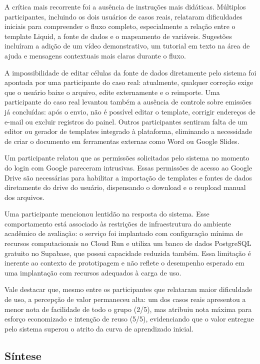 \documentclass[article,a4paper,12pt,brazil,sumario=tradicional]{abntex2}
\begin{document}
A crítica mais recorrente foi a ausência de instruções mais didáticas. Múltiplos participantes, incluindo os dois usuários de casos reais, relataram dificuldades iniciais para compreender o fluxo completo, especialmente a relação entre o template Liquid, a fonte de dados e o mapeamento de variáveis. Sugestões incluíram a adição de um vídeo demonstrativo, um tutorial em texto na área de ajuda e mensagens contextuais mais claras durante o fluxo.

A impossibilidade de editar células da fonte de dados diretamente pelo sistema foi apontada por uma participante do caso real: atualmente, qualquer correção exige que o usuário baixe o arquivo, edite externamente e o reimporte. Uma participante do caso real levantou também a ausência de controle sobre emissões já concluídas: após o envio, não é possível editar o template, corrigir endereços de e-mail ou excluir registros do painel. Outros participantes sentiram falta de um editor ou gerador de templates integrado à plataforma, eliminando a necessidade de criar o documento em ferramentas externas como Word ou Google Slides.

Um participante relatou que as permissões solicitadas pelo sistema no momento do login com Google pareceram intrusivas. Essas permissões de acesso ao Google Drive são necessárias para habilitar a importação de templates e fontes de dados diretamente do drive do usuário, dispensando o download e o reupload manual dos arquivos.

Uma participante mencionou lentidão na resposta do sistema. Esse comportamento está associado às restrições de infraestrutura do ambiente acadêmico de avaliação: o serviço foi implantado com configuração mínima de recursos computacionais no Cloud Run e utiliza um banco de dados PostgreSQL gratuito no Supabase, que possui capacidade reduzida também. Essa limitação é inerente ao contexto de prototipagem e não reflete o desempenho esperado em uma implantação com recursos adequados à carga de uso.

Vale destacar que, mesmo entre os participantes que relataram maior dificuldade de uso, a percepção de valor permaneceu alta: um dos casos reais apresentou a menor nota de facilidade de todo o grupo (2/5), mas atribuiu nota máxima para esforço economizado e intenção de reuso (5/5), evidenciando que o valor entregue pelo sistema superou o atrito da curva de aprendizado inicial.

\subsection{Síntese}
\end{document}
